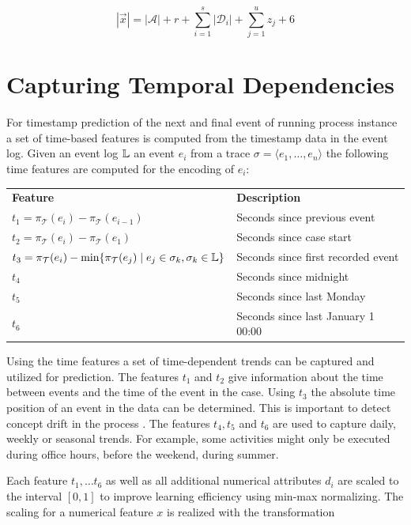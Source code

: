 \begin{equation}
	|\vec{x}|= |\mathcal{A}| + r + \sum_{i=1}^{s} |\mathcal{D}_i| + \sum_{j=1}^{u} z_j + 6
\end{equation}


\section{Capturing Temporal Dependencies}\label{sec:time}


For timestamp prediction of the next and final event of running process instance a set of time-based features is computed from the timestamp data in the event log.
Given an event log $\mathbb{L}$ an event $e_i$ from a trace $\sigma = \langle e_1, \dots, e_n \rangle$ the following time features are computed for the encoding of $e_i$: 

\begin{center}
\begin{tabularx}{\textwidth}{l l}
	\centering
	 \textbf{Feature} & \textbf{Description} \\
	$t_1 = \pi_\mathcal{T}(e_i) - \pi_\mathcal{T}(e_{i-1})$ & Seconds since previous event \\
	$t_2 = \pi_\mathcal{T}(e_i) - \pi_\mathcal{T}(e_1)$ & Seconds since case start \\
	$t_3 = \pi_\mathcal{T}(e_i) - \min\{\pi_\mathcal{T}(e_{j}) \mid  e_j \in \sigma_k, \sigma_k \in \mathbb{L}\}$ & Seconds since first recorded event \\
	$t_4$ & Seconds since midnight \\
	$t_5$ & Seconds since last Monday \\
	$t_6$ & Seconds since last January 1 00:00
\end{tabularx}
\end{center}

Using the time features a set of time-dependent trends can be captured and utilized for prediction.
The features $t_1$ and $t_2$ give information about the time between events and the time of the event in the case.
Using $t_3$ the absolute time position of an event in the data can be determined.
This is important to detect concept drift in the process \cite{DBLP:journals/tnn/BoseAZP14}.
The features $t_4, t_5$ and $t_6$ are used to capture daily, weekly or seasonal trends.
For example, some activities might only be executed during office hours, before the weekend, during summer.

Each feature $t_1, \dots t_6$ as well as all additional numerical attributes $d_i$ are scaled to the interval $ [0, 1]$ to improve learning efficiency using min-max normalizing.
The scaling for a numerical feature $x$ is realized with the transformation

